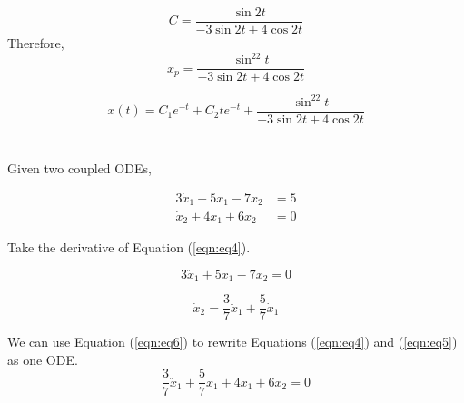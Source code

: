 \documentclass[12pt]{article}
\numberwithin{equation}{section}
\newcommand\ddfrac[2]{\frac{\displaystyle #1}{\displaystyle #2}}
\begin{document}
  \begin{equation}
      C = \ddfrac{\sin2t}{-3\sin2t + 4\cos2t}
  \end{equation}
  Therefore,
  \begin{equation}
    x_p = \ddfrac{\sin^22t}{-3\sin2t + 4\cos2t}
  \end{equation}

  \begin{equation}
    x(t) = C_1 e^{-t} + C_2 te^{-t} + \ddfrac{\sin^22t}{-3\sin2t + 4\cos2t}
  \end{equation}






  \section{}

  Given two coupled ODEs,

  \begin{align}
    3\dot x_1 + 5 x_1 - 7x_2 &= 5 \label{eqn:eq4}\\
    \dot x_2 + 4x_1 + 6x_2 &= 0 \label{eqn:eq5}
  \end{align}

  Take the derivative of Equation (\ref{eqn:eq4}).

  \begin{equation}
    3\ddot x_1 + 5\dot x_1 - 7 x_2 = 0
  \end{equation}

  \begin{equation} \label{eqn:eq6}
    \dot x_2 = \frac{3}{7} \ddot x_1 + \frac{5}{7} \dot x_1
  \end{equation}

  We can use Equation (\ref{eqn:eq6}) to rewrite Equations (\ref{eqn:eq4}) and (\ref{eqn:eq5}) as one ODE.
  \begin{equation}
    \frac{3}{7}\ddot x_1 + \frac{5}{7} \dot x_1 + 4 x_1 + 6 x_2 = 0
  \end{equation}
\end{document}
